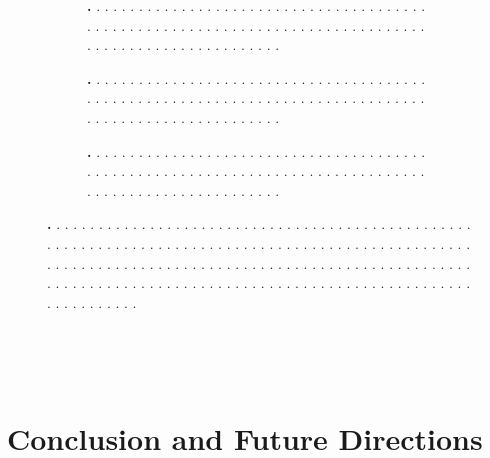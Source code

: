 \documentclass[letterpaper,10pt,conference,twoside]{IEEEtran}
\theoremstyle{definition}
\begin{document}
\begin{figure}[t!]
  \centering
  \begin{subfigure}[t]{\linewidth}
  \hspace*{-.3cm}
  \caption{\textbf{.   }.   .   .   .   .   .   .   .   .   .   .   .   .   .   .   .   .   .   .   .   .   .   .   .   .   .   .   .   .   .   .   .   .   .   .   .   .   .   .   .   .   .   .   .   .   .   .   .   .   .   .   .   .   .   .   .   .   .   .   .   .   .   .   .   .   .   .   .   .   .   .   .   .   .   .   .   .   .   .   .   .   .   .   .   .   .   .   .   .   .   .   .   .   .   .   .   .   .   .   .   .   .}
  \end{subfigure}
  \begin{subfigure}[t]{\linewidth}
  \hspace*{-.3cm}
  \caption{\textbf{.   }.   .   .   .   .   .   .   .   .   .   .   .   .   .   .   .   .   .   .   .   .   .   .   .   .   .   .   .   .   .   .   .   .   .   .   .   .   .   .   .   .   .   .   .   .   .   .   .   .   .   .   .   .   .   .   .   .   .   .   .   .   .   .   .   .   .   .   .   .   .   .   .   .   .   .   .   .   .   .   .   .   .   .   .   .   .   .   .   .   .   .   .   .   .   .   .   .   .   .   .   .   .}
  \end{subfigure}
  \begin{subfigure}[t]{\linewidth}
  \hspace*{-.3cm}
  \caption{\textbf{.   }.   .   .   .   .   .   .   .   .   .   .   .   .   .   .   .   .   .   .   .   .   .   .   .   .   .   .   .   .   .   .   .   .   .   .   .   .   .   .   .   .   .   .   .   .   .   .   .   .   .   .   .   .   .   .   .   .   .   .   .   .   .   .   .   .   .   .   .   .   .   .   .   .   .   .   .   .   .   .   .   .   .   .   .   .   .   .   .   .   .   .   .   .   .   .   .   .   .   .   .   .   .}
  \end{subfigure}
  \caption[.]{\textbf{.   }.   .   .   .   .   .   .   .   .   .   .   .   .   .   .   .   .   .   .   .   .   .   .   .   .   .   .   .   .   .   .   .   .   .   .   .   .   .   .   .   .   .   .   .   .   .   .   .   .   .   .   .   .   .   .   .   .   .   .   .   .   .   .   .   .   .   .   .   .   .   .   .   .   .   .   .   .   .   .   .   .   .   .   .   .   .   .   .   .   .   .   .   .   .   .   .   .   .   .   .   .   .   .   .   .   .   .   .   .   .   .   .   .   .   .   .   .   .   .   .   .   .   .   .   .   .   .   .   .   .   .   .   .   .   .   .   .   .   .   .   .   .   .   .   .   .   .   .   .   .   .   .   .   .   .   .   .   .   .   .   .   .   .   .   .   .   .   .   .   .   .   .   .   .   .   .   .   .   .   .   .   .   .   .   .   .   .   .   .   .   .   .   .   .   .   .   .   .   .   .   .   .   .   .   .   .   .   .   .   .}
  \label{fig:1}
\end{figure}


~ 
\newpage

~
\newpage


\section{Conclusion and Future Directions}\label{sec:conc}
\noindent


{\small
 

}
\end{document}
